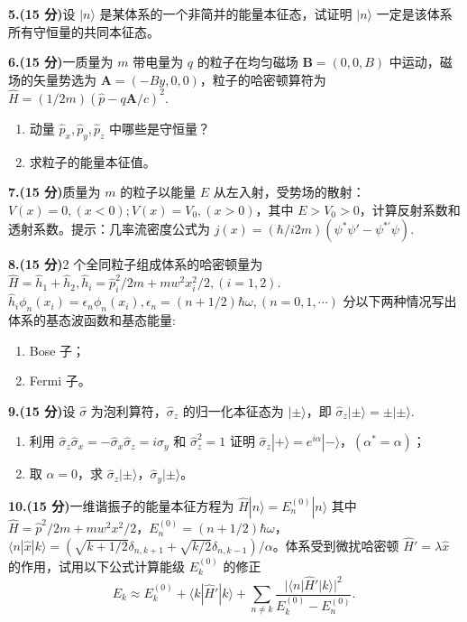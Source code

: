 \textbf{5.(15 分)}设 $|n\rangle$ 是某体系的一个非简并的能量本征态，试证明 $|n\rangle$ 一定是该体系所有守恒量的共同本征态。

\textbf{6.(15 分)}一质量为 $m$ 带电量为 $q$ 的粒子在均匀磁场 $\mathbf{B} = (0,0,B)$ 中运动，磁场的矢量势选为 $\mathbf{A} = (-By,0,0)$，粒子的哈密顿算符为 $\hat{H} = (1/2m)(\hat{p} - q\mathbf{A}/c)^2$.
    \begin{enumerate}
        \item 动量 $\hat{p}_x, \hat{p}_y, \hat{p}_z$ 中哪些是守恒量？
        \item 求粒子的能量本征值。
    \end{enumerate}

\textbf{7.(15 分)}质量为 $m$ 的粒子以能量 $E$ 从左入射，受势场的散射：$V(x) = 0, (x < 0); V(x) = V_0, (x > 0)$，其中 $E > V_0 > 0$，计算反射系数和透射系数。提示：几率流密度公式为 $j(x) = (\hbar/i2m)(\psi^*\psi' - \psi^{*'}\psi)$.

\textbf{8.(15 分)}2 个全同粒子组成体系的哈密顿量为 $\hat{H} = \hat{h}_1 + \hat{h}_2, \hat{h}_i = \hat{p}_i^2/2m + mw^2 x_i^2/2, (i = 1,2)$. $\hat{h}_i \phi_n(x_i) = \epsilon_n \phi_n(x_i), \epsilon_n = (n + 1/2)\hbar \omega, (n = 0,1,\cdots)$ 分以下两种情况写出体系的基态波函数和基态能量: 
    \begin{enumerate}
        \item  Bose 子；
        \item  Fermi 子。
    \end{enumerate}

 \textbf{9.(15 分)}设 $\hat{\sigma}$ 为泡利算符，$\hat{\sigma}_z$ 的归一化本征态为 $| \pm \rangle$，即 $\hat{\sigma}_z | \pm \rangle = \pm | \pm\rangle$.
    \begin{enumerate}
        \item 利用 $\hat{\sigma}_z \hat{\sigma}_x = -\hat{\sigma}_x \hat{\sigma}_z = i \hat{\sigma}_y$ 和 $\hat{\sigma}_z^2 = 1$ 证明 $\hat{\sigma}_z | + \rangle = e^{i \alpha} | - \rangle$，$(\alpha^* = \alpha)$；
        \item 取 $\alpha = 0$，求 $\hat{\sigma}_z | \pm \rangle$，$\hat{\sigma}_y | \pm \rangle$。
    \end{enumerate}   

 \textbf{10.(15 分)}一维谐振子的能量本征方程为 $\hat{H}|n\rangle = E_n^{(0)} |n\rangle$ 其中 $\hat{H} = \hat{p}^2/2m + mw^2 x^2 / 2$，$E_n^{(0)} = (n + 1/2)\hbar \omega$，$\langle n| \hat{x} | k \rangle =\left( \sqrt{k+1/2} \delta_{n, k+1} + \sqrt{k/2} \delta_{n, k-1} \right)/\alpha$。体系受到微扰哈密顿 $\hat{H}' = \lambda \hat{x}$ 的作用，试用以下公式计算能级 $E_k^{(0)}$ 的修正
$$E_k \approx E_k^{(0)} + \langle k | \hat{H}' | k \rangle + \sum_{n\neq k} \frac{|\langle n | \hat{H}' | k \rangle |^2}{E_k^{(0)} - E_n^{(0)}}.~$$